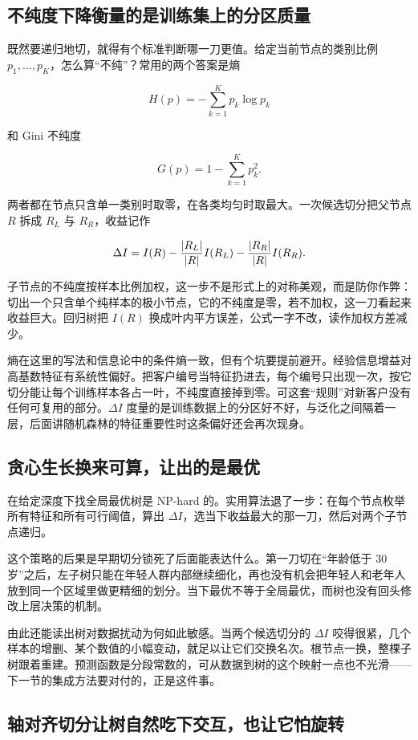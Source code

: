 \subsection{不纯度下降衡量的是训练集上的分区质量}

既然要递归地切，就得有个标准判断哪一刀更值。给定当前节点的类别比例 \(p_1,\ldots,p_K\)，怎么算``不纯''？常用的两个答案是熵

\[
H(p)=-\sum_{k=1}^{K}p_k\log p_k
\]

和 Gini 不纯度

\[
G(p)=1-\sum_{k=1}^{K}p_k^2 .
\]

两者都在节点只含单一类别时取零，在各类均匀时取最大。一次候选切分把父节点 \(R\) 拆成 \(R_L\) 与 \(R_R\)，收益记作

\[
\Delta I = I(R) - \frac{\left|R_L\right|}{\left|R\right|}I(R_L) - \frac{\left|R_R\right|}{\left|R\right|}I(R_R).
\]

子节点的不纯度按样本比例加权，这一步不是形式上的对称美观，而是防你作弊：切出一个只含单个纯样本的极小节点，它的不纯度是零，若不加权，这一刀看起来收益巨大。回归树把 \(I(R)\) 换成叶内平方误差，公式一字不改，读作加权方差减少。

熵在这里的写法和信息论中的条件熵一致，但有个坑要提前避开。经验信息增益对高基数特征有系统性偏好。把客户编号当特征扔进去，每个编号只出现一次，按它切分能让每个训练样本各占一叶，不纯度直接掉到零。可这套``规则''对新客户没有任何可复用的部分。\(\Delta I\) 度量的是训练数据上的分区好不好，与泛化之间隔着一层，后面讲随机森林的特征重要性时这条偏好还会再次现身。

\subsection{贪心生长换来可算，让出的是最优}

在给定深度下找全局最优树是 NP-hard 的。实用算法退了一步：在每个节点枚举所有特征和所有可行阈值，算出 \(\Delta I\)，选当下收益最大的那一刀，然后对两个子节点递归。

这个策略的后果是早期切分锁死了后面能表达什么。第一刀切在``年龄低于 30 岁''之后，左子树只能在年轻人群内部继续细化，再也没有机会把年轻人和老年人放到同一个区域里做更精细的划分。当下最优不等于全局最优，而树也没有回头修改上层决策的机制。

由此还能读出树对数据扰动为何如此敏感。当两个候选切分的 \(\Delta I\) 咬得很紧，几个样本的增删、某个数值的小幅变动，就足以让它们交换名次。根节点一换，整棵子树跟着重建。预测函数是分段常数的，可从数据到树的这个映射一点也不光滑——下一节的集成方法要对付的，正是这件事。

\subsection{轴对齐切分让树自然吃下交互，也让它怕旋转}

